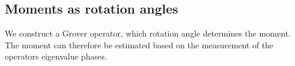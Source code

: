 %
%



\subsection{Moments as rotation angles}

We construct a Grover operator, which rotation angle determines the moment.
The moment can therefore be estimated based on the measurement of the operators eigenvalue phases.

